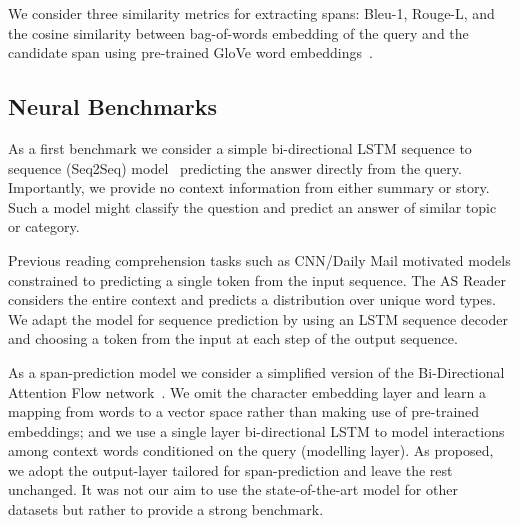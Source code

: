 \documentclass[11pt,letterpaper]{article}
\begin{document}
We consider three similarity metrics for extracting spans: \mbox{Bleu-1}, Rouge-L, and the cosine similarity between bag-of-words embedding of the query and the candidate span using pre-trained GloVe word embeddings~\cite{glove}. 




\subsection{Neural Benchmarks}
\label{sec:neural_baselines}


As a first benchmark we consider a simple bi-directional LSTM sequence to sequence (Seq2Seq) model~\cite{sutskever2014sequence} predicting the answer directly from the query. Importantly, we provide no context information from either summary or story. Such a model might classify the question and predict an answer of similar topic or category.

Previous reading comprehension tasks such as CNN/Daily Mail motivated
models constrained to predicting a single token from the input sequence. The AS Reader \cite{kadlec2016text} considers the entire context and predicts a distribution over unique word types.
We adapt the model for sequence prediction
by using an LSTM sequence decoder and choosing a token from the input at each step of the output sequence.

As a span-prediction model we consider a simplified version of the Bi-Directional Attention Flow network~\cite{seo2016bidirectional}. We omit the character embedding layer and learn a mapping from words to a vector space rather than making use of pre-trained embeddings; and we use a single layer bi-directional LSTM to model interactions among context words conditioned on the query (modelling layer). As proposed, we adopt the output-layer tailored for span-prediction and leave the rest unchanged.
It was not our aim to use the state-of-the-art model for other datasets but rather to provide a strong benchmark.
\end{document}
